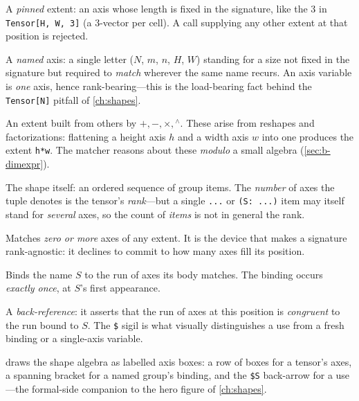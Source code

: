 \begin{description}[leftmargin=1.6em, style=nextline, nosep]
\item[Literal $n$.] A \emph{pinned} extent: an axis whose length is fixed in the
signature, like the $3$ in \lstinline[style=l4style]|Tensor[H, W, 3]| (a 3-vector
per cell). A call supplying any other extent at that position is rejected.
\item[Axis variable $s$.] A \emph{named} axis: a single letter ($N$, $m$, $n$,
$H$, $W$) standing for a size not fixed in the signature but required to
\emph{match} wherever the same name recurs. An axis variable is \emph{one} axis,
hence rank-bearing---this is the load-bearing fact behind the
\lstinline[style=l4style]|Tensor[N]| pitfall of \cref{ch:shapes}.
\item[Algebraic combination.] An extent built from others by $+,-,\times,{}^\wedge$.
These arise from reshapes and factorizations: flattening a height axis $h$ and a
width axis $w$ into one produces the extent \lstinline[style=l4style]|h*w|. The
matcher reasons about these \emph{modulo} a small algebra (\cref{sec:b-dimexpr}).
\item[{Shape tuple $[\gamma_1,\dots,\gamma_k]$.}] The shape itself: an ordered
sequence of group items. The \emph{number} of axes the tuple denotes is the
tensor's \emph{rank}---but a single \lstinline[style=l4style]|...| or
\lstinline[style=l4style]|(S: ...)| item may itself stand for \emph{several} axes,
so the count of \emph{items} is not in general the rank.
\item[Rank wildcard \code{...}.] Matches \emph{zero or more}
axes of any extent. It is the device that makes a signature rank-agnostic: it
declines to commit to how many axes fill its position.
\item[Named group, binding \code{(S: ...)}.] Binds the name
$S$ to the run of axes its body matches. The binding occurs \emph{exactly once},
at $S$'s first appearance.
\item[{Named group, use \code{\$S}.}] A \emph{back-reference}: it
asserts that the run of axes at this position is \emph{congruent} to the run bound
to $S$. The \lstinline[style=l4style]|$| sigil is what visually distinguishes a use
from a fresh binding or a single-axis variable.
\end{description}

 draws the shape algebra as labelled axis boxes: a row of
boxes for a tensor's axes, a spanning bracket for a named group's binding, and the
\lstinline[style=l4style]|$S| back-arrow for a use---the formal-side companion to
the hero figure of \cref{ch:shapes}.

